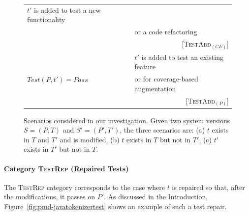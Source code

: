 \documentclass[conference]{IEEEtran}
\newcommand{\lang}[1]{\texttt{\small #1}}
\newcommand{\subject}[1]{\texttt{\small #1}}
\newcommand{\mt}{\mathit}
\newcommand{\pass}{\mt{Pass}}
\newcommand{\testfunc}[2]{\mt{Test(#1, #2)}}
\newcommand{\catrep}{\textsc{TestRep}}
\newcommand{\cataddce}{\textsc{TestAdd}$_\mt{(CE)}$}
\newcommand{\cataddp}{\textsc{TestAdd}$_\mt{(P)}$}
\begin{document}
\begin{figure}[t]
\begin{tabular}{|l||l|}
  $t'$ is added to test a new functionality \\
  & or a code refactoring \\
  & \multicolumn{1}{r|}{\scriptsize [\cataddce{}]} \\
  \hline
  \multirow{3}{*}{$\testfunc{P}{t'} = \pass$} &
  $t'$ is added to test an existing feature\\
  & or for coverage-based augmentation \\
  & \multicolumn{1}{r|}{\scriptsize [\cataddp{}]} \\
  \hline
\end{tabular}
\caption{Scenarios considered in our investigation. Given two system
  versions $S = (P, T)$ and $S' = (P', T')$, the three scenarios are:
  (a) $t$ exists in $T$ and $T'$ and is modified, (b) $t$ exists in
  $T$ but not in $T'$, (c) $t'$ exists in $T'$ but not in $T$.}
\vspace*{-5pt}
\label{fig:study-design}
\end{figure}

\paragraph{Category \catrep{} (Repaired Tests)}
\label{sec:category-rep}

The \catrep{} category corresponds to the case where $t$ is repaired
so that, after the modifications, it passes on $P'.$ As discussed in
the Introduction, Figure~\ref{fig:pmd-javatokenizertest} shows an
example of such a test repair.


\end{document}
